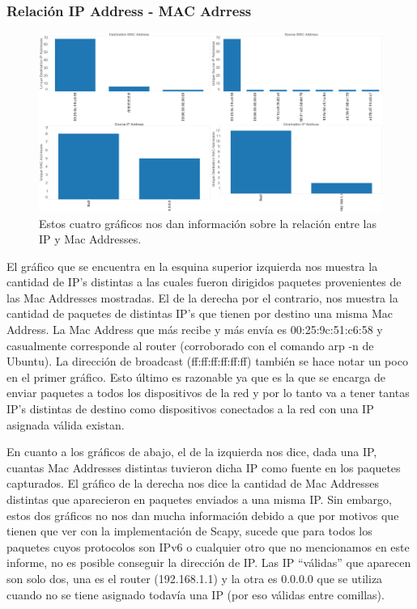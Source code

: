 \documentclass{article}
\theoremstyle{definition}
\theoremstyle{remark}
\begin{document}
\subsubsection{Relación IP Address - MAC Adrress}
\begin{figure}[H]
    \centering
    \includegraphics[width=1\textwidth]{../captures/CasaGerman/IP vs MAC Correspondence.png}
    \caption{Estos cuatro gráficos nos dan información sobre la relación entre las IP y Mac Addresses.}
    \label{fig:mesh1}
\end{figure}

El gráfico que se encuentra en la esquina superior izquierda nos muestra la cantidad de IP's distintas a las cuales fueron dirigidos paquetes provenientes de las Mac Addresses mostradas. El de la derecha por el contrario, nos muestra la cantidad de paquetes de distintas IP's que tienen por destino una misma Mac Address. La Mac Address que más recibe y más envía es 00:25:9c:51:c6:58 y casualmente corresponde al router (corroborado con el comando arp -n de Ubuntu). La dirección de broadcast (ff:ff:ff:ff:ff:ff) también se hace notar un poco en el primer gráfico. Esto último es razonable ya que es la que se encarga de enviar paquetes a todos los dispositivos de la red y por lo tanto va a tener tantas IP's distintas de destino como dispositivos conectados a la red con una IP asignada válida existan.
\par En cuanto a los gráficos de abajo, el de la izquierda nos dice, dada una IP, cuantas Mac Addresses distintas tuvieron dicha IP como fuente en los paquetes capturados. El gráfico de la derecha nos dice la cantidad de Mac Addresses distintas que aparecieron en paquetes enviados a una misma IP. Sin embargo, estos dos gráficos no nos dan mucha información debido a que por motivos que tienen que ver con la implementación de Scapy, sucede que para todos los paquetes cuyos protocolos son IPv6 o cualquier otro que no mencionamos en este informe, no es posible conseguir la dirección de IP. Las IP ``válidas'' que aparecen son solo dos, una es el router (192.168.1.1) y la otra es 0.0.0.0 que se utiliza cuando no se tiene asignado todavía una IP (por eso válidas entre comillas).
\end{document}
